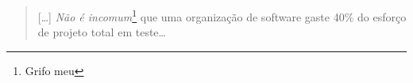 \begin{frame}{\subsecname}
  \blockquote[{\cite[Pressman]{pressman_engenharia_1995}}]{
    […] \emph{Não é incomum}\footnote{Grifo meu} que uma organização de software gaste 40\% do
    esforço de projeto total em teste…
  }
\end{frame}
